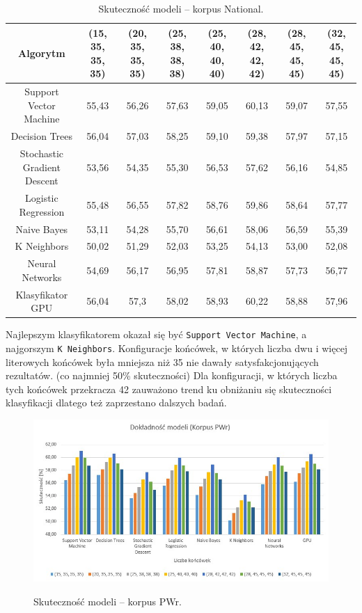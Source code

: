 \begin{landscape}
	\begin{table}[H]
		\centering
		\caption{Skuteczność modeli -- korpus National.}
		\begin{tabular}{cccccccc}
			\toprule
			\textbf{Algorytm} & \textbf{(15, 35, 35, 35)} & \textbf{(20, 35, 35, 35)} & \textbf{(25, 38, 38, 38)} & \textbf{(25, 40, 40, 40)} & \textbf{(28, 42, 42, 42)} & \textbf{(28, 45, 45, 45)} & \textbf{(32, 45, 45, 45)} \\
			\midrule
			Support Vector Machine & 55,43 & 56,26 & 57,63 & 59,05 & 60,13 & 59,07 & 57,55 \\
			Decision Trees & 56,04 & 57,03 & 58,25 & 59,10 & 59,38 & 57,97 & 57,15 \\
			Stochastic Gradient Descent & 53,56 & 54,35 & 55,30 & 56,53 & 57,62 & 56,16 & 54,85 \\
			Logistic Regression & 55,48 & 56,55 & 57,82 & 58,76 & 59,86 & 58,64 & 57,77 \\
			Naive Bayes & 53,11 & 54,28 & 55,70 & 56,61 & 58,06 & 56,59 & 55,39 \\
			K Neighbors & 50,02 & 51,29 & 52,03 & 53,25 & 54,13 & 53,00 & 52,08 \\
			Neural Networks & 54,69 & 56,17 & 56,95 & 57,81 & 58,87 & 57,73 & 56,77 \\
			Klasyfikator GPU & 56,04 & 57,3 & 58,02 & 58,93 & 60,22 & 58,88 & 57,96 \\
			\bottomrule
		\end{tabular}
	\end{table}
\end{landscape}

Najlepszym klasyfikatorem okazał się być \texttt{Support Vector Machine}, a najgorszym \texttt{K Neighbors}. Konfiguracje końcówek, w których liczba dwu i więcej literowych końcówek była mniejsza niż 35 nie dawały satysfakcjonujących rezultatów. (co najmniej 50\% skuteczności) Dla konfiguracji, w których liczba tych końcówek przekracza 42 zauważono trend ku obniżaniu się skuteczności klasyfikacji dlatego też zaprzestano dalszych badań.

\begin{figure}[H]
	\centering
	\includegraphics[width=\linewidth]{charts/korpuspwrwykres}
	\label{Rysunek}
	\caption{Skuteczność modeli -- korpus PWr.}
\end{figure}

